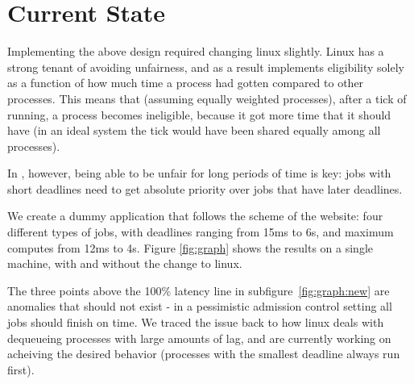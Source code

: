 \section{Current State}

Implementing the above design required changing linux slightly. Linux has a
strong tenant of avoiding unfairness, and as a result implements eligibility
solely as a function of how much time a process had gotten compared to other
processes. This means that (assuming equally weighted processes), after a tick
of running, a process becomes ineligible, because it got more time that it
should have (in an ideal system the tick would have been shared equally among
all processes).

In \sysname, however, being able to be unfair for long periods of time is key:
jobs with short deadlines need to get absolute priority over jobs that have
later deadlines.

We create a dummy application that follows the scheme of the website: four
different types of jobs, with deadlines ranging from 15ms to 6s, and maximum
computes from 12ms to 4s. Figure \ref{fig:graph} shows the results on a single
machine, with and without the change to linux. 

The three points above the 100$\%$ latency line in subfigure~\ref{fig:graph:new}
are anomalies that should not exist - in a pessimistic admission control setting
all jobs should finish on time. We traced the issue back to how linux deals with
dequeueing processes with large amounts of lag, and are currently working on
acheiving the desired behavior (processes with the smallest deadline always run
first).